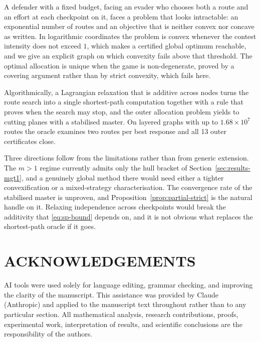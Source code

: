 \documentclass[10pt,a4paper,twoside]{article}
\theoremstyle{plain}
\theoremstyle{definition}
\begin{document}
A defender with a fixed budget, facing an evader who chooses both a route and
an effort at each checkpoint on it, faces a problem that looks intractable:
an exponential number of routes and an objective that is neither convex nor
concave as written. In logarithmic coordinates the problem is convex whenever
the contest intensity does not exceed $1$, which makes a certified global
optimum reachable, and we give an explicit graph on which convexity fails
above that threshold. The optimal allocation is unique when the game is
non-degenerate, proved by a covering argument rather than by strict
convexity, which fails here.

Algorithmically, a Lagrangian relaxation that is additive across nodes turns
the route search into a single shortest-path computation together with a rule
that proves when the search may stop, and the outer allocation problem yields
to cutting planes with a stabilised master. On layered graphs with up to
$1.68\times10^{7}$ routes the oracle examines two routes per best response
and all 13 outer certificates close.

Three directions follow from the limitations rather than from generic
extension. The $m>1$ regime currently admits only the hull bracket of
Section~\ref{sec:results-mgt1}, and a genuinely global method there would
need either a tighter convexification or a mixed-strategy characterisation.
The convergence rate of the stabilised master is unproven, and
Proposition~\ref{prop:partial-strict} is the natural handle on it. Relaxing
independence across checkpoints would break the additivity that
\eqref{eq:sp-bound} depends on, and it is not obvious what replaces the
shortest-path oracle if it goes.

\section*{ACKNOWLEDGEMENTS}


AI tools were used solely for language editing, grammar checking, and
improving the clarity of the manuscript. This assistance was provided by
Claude (Anthropic) and applied to the manuscript text throughout rather than
to any particular section. All mathematical analysis, research
contributions, proofs, experimental work, interpretation of results, and
scientific conclusions are the responsibility of the authors.
\end{document}
